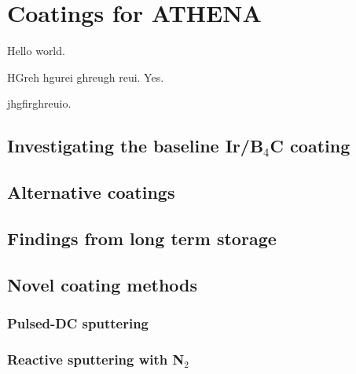 \chapter{Coatings for ATHENA}
Hello world.

HGreh hgurei ghreugh reui.
Yes.

jhgfirghreuio.

\section{Investigating the baseline Ir/B$_4$C coating}
\section{Alternative coatings}
\section{Findings from long term storage}
\section{Novel coating methods}
\subsection{Pulsed-DC sputtering}

\subsection{Reactive sputtering with N$_2$}
